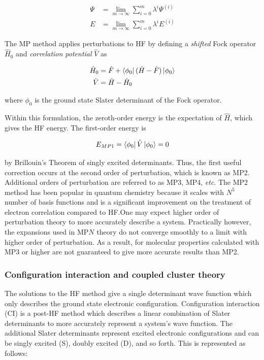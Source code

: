 \begin{align}
 \Psi &= \lim_{m\to\infty} \sum_{i=0}^{m} \lambda^i \Psi^{(i)} \\
  E &= \lim_{m\to\infty} \sum_{i=0}^{m} \lambda^i E^{(i)}
\end{align}

The MP method applies perturbations to HF by defining a \emph{shifted} Fock operator $\hat{H}_0$ and \emph{correlation potential} $\hat{V}$ as

\begin{align}
  \hat{H}_0 &= \hat{F} + \bra{\phi_0}(\hat{H}-\hat{F})\ket{\phi_0} \\
  \hat{V}   &= \hat{H} - \hat{H}_0
\end{align}

\noindent where $\phi_0$ is the ground state Slater determinant of the Fock operator.

Within this formulation, the zeroth-order energy is the expectation of $\hat{H}$, which gives the HF energy. The first-order energy is

\begin{equation}
  E_{MP1} = \bra{\phi_0}\hat{V}\ket{\phi_0} = 0
\end{equation}

\noindent by Brillouin's Theorem of singly excited determinants. Thus, the first useful correction occurs at the second order of perturbation, which is known as MP2. Additional orders of perturbation are referred to as MP3, MP4, \emph{etc}. The MP2 method has been popular in quantum chemistry because it scales with $N^5$ number of basis functions and is a significant improvement on the treatment of electron correlation compared to HF.\@ One may expect higher order of perturbation theory to more accurately describe a system. Practically however, the expansions used in MP$N$ theory do not converge smoothly to a limit with higher order of perturbation.\cite{Leininger2000} As a result, for molecular properties calculated with MP3 or higher are not guaranteed to give more accurate results than MP2.

\subsubsection{Configuration interaction and coupled cluster theory}

The solutions to the HF method give a single determinant wave function which only describes the ground state electronic configuration. Configuration interaction (CI) is a post-HF method which describes a linear combination of Slater determinants to more accurately represent a system's wave function. The additional Slater determinants represent excited electronic configurations and can be singly excited (S), doubly excited (D), and so forth. This is represented as follows:

